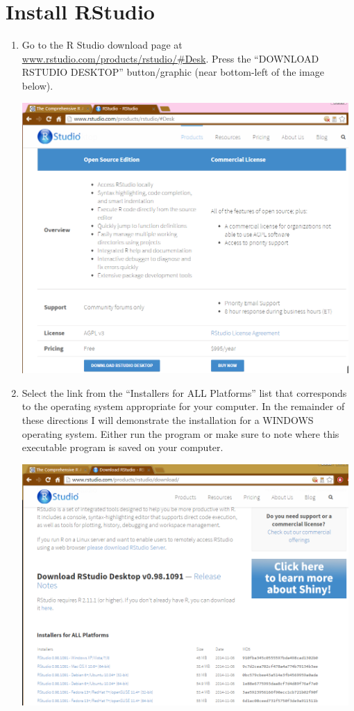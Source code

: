 \documentclass{article}\usepackage[]{graphicx}\usepackage[]{color}
\begin{document}
\section{Install RStudio}
\begin{enumerate}
  \item Go to the R Studio download page at \href{http://www.rstudio.com/products/rstudio/\#Desk}{www.rstudio.com/products/rstudio/\#Desk}.  Press the ``DOWNLOAD RSTUDIO DESKTOP'' button/graphic (near bottom-left of the image below).
\begin{center}
  \includegraphics[width=4.9in]{Figs/RStudio_Install_Home.png}
\end{center}

  \item Select the link from the ``Installers for ALL Platforms'' list that corresponds to the operating system appropriate for your computer.  In the remainder of these directions I will demonstrate the installation for a WINDOWS operating system.  Either run the program or make sure to note where this executable program is saved on your computer.
\begin{center}
  \includegraphics[width=4.9in]{Figs/RStudio_Install_ChooseOS.png}
\end{center}


\end{enumerate}
\end{document}
